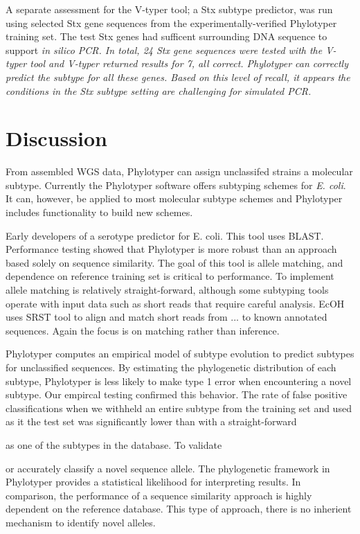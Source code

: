 \documentclass{bioinfo}
\begin{document}
A separate assessment for the V-typer tool; a Stx subtype predictor, was run using selected Stx gene sequences from the experimentally-verified Phylotyper training set.
The test Stx genes had sufficent surrounding DNA sequence to support \it{in silico} PCR.
In total, 24 Stx gene sequences were tested with the V-typer tool and V-typer returned results for 7, all correct.
Phylotyper can correctly predict the subtype for all these genes.
Based on this level of recall, it appears the conditions in the Stx subtype setting are challenging for simulated PCR.

\section{Discussion}

From assembled WGS data, Phylotyper can assign unclassifed strains a molecular subtype.
Currently the Phylotyper software offers subtyping schemes for \textit{E. coli}.
It can, however, be applied to most molecular subtype schemes and Phylotyper includes functionality to build new schemes.

Early developers of a serotype predictor for E. coli. This tool uses BLAST.
Performance testing showed that Phylotyper is more robust than an approach based solely on sequence similarity.
The goal of this tool is allele matching, and dependence on reference training set is critical to performance.
To implement allele matching is relatively straight-forward, although some subtyping tools operate with input data such as short reads that require careful analysis.
EcOH uses SRST tool to align and match short reads from ... to known annotated sequences. Again the focus is on matching rather than inference.

Phylotyper computes an empirical model of subtype evolution to predict subtypes for unclassified sequences.
By estimating the phylogenetic distribution of each subtype, Phylotyper is less likely to make type 1 error when encountering a novel subtype. Our empircal testing confirmed this behavior. 
The rate of false positive classifications when we withheld an entire subtype from the training set and used as it the test set was significantly lower than with a straight-forward 

 as one of the subtypes in the database. To validate



or accurately classify a novel sequence allele.
The phylogenetic framework in Phylotyper provides a statistical likelihood for interpreting results.
In comparison, the performance of a sequence similarity approach is highly dependent on the reference database.
This type of approach, there is no inherient mechanism to identify novel alleles.
\end{document}

